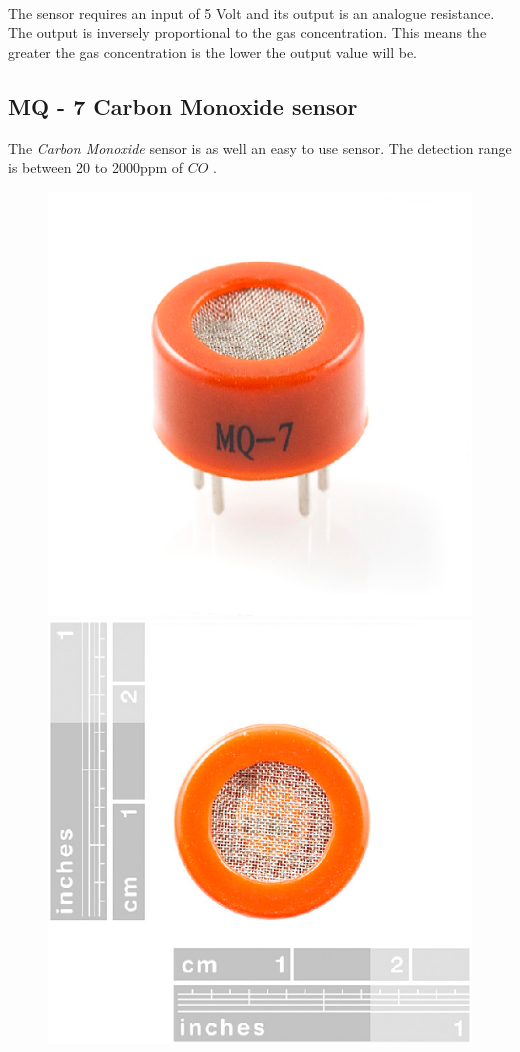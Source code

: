 \documentclass[12pt,a4paper,draft]{report}
\begin{document}
\ \\
The sensor requires an input of 5 Volt and its output is an analogue resistance. The output is inversely proportional to the gas concentration. This means the greater the gas concentration is the lower the output value will be.
\ \\
%
\subsection{MQ - 7 Carbon Monoxide  sensor}
The \emph{Carbon Monoxide} sensor is as well an easy to use sensor.  The detection range is between 20 to 2000ppm of $CO$ \cite{website:mq7}.
\ \\
\begin{figure}[H]
\centering
\includegraphics*[scale=0.45]{mq7}
\includegraphics*[scale=0.45]{mq7_2}

\end{figure}
\end{document}
